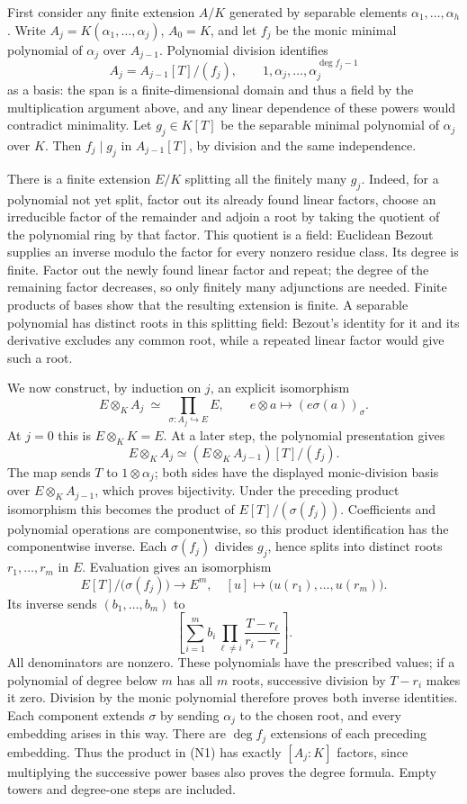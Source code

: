 \documentclass[11pt,a4paper,openany]{report}
\begin{document}
First consider any finite extension \(A/K\) generated by separable elements \(\alpha_1,\ldots,\alpha_h\). Write \(A_j=K(\alpha_1,\ldots,\alpha_j)\), \(A_0=K\), and let \(f_j\) be the monic minimal polynomial of \(\alpha_j\) over \(A_{j-1}\). Polynomial division identifies \[
A_j=A_{j-1}[T]/(f_j),\qquad
1,\alpha_j,\ldots,\alpha_j^{\deg f_j-1}
\] as a basis: the span is a finite-dimensional domain and thus a field by the multiplication argument above, and any linear dependence of these powers would contradict minimality. Let \(g_j\in K[T]\) be the separable minimal polynomial of \(\alpha_j\) over \(K\). Then \(f_j\mid g_j\) in \(A_{j-1}[T]\), by division and the same independence.

There is a finite extension \(E/K\) splitting all the finitely many \(g_j\). Indeed, for a polynomial not yet split, factor out its already found linear factors, choose an irreducible factor of the remainder and adjoin a root by taking the quotient of the polynomial ring by that factor. This quotient is a field: Euclidean Bezout supplies an inverse modulo the factor for every nonzero residue class. Its degree is finite. Factor out the newly found linear factor and repeat; the degree of the remaining factor decreases, so only finitely many adjunctions are needed. Finite products of bases show that the resulting extension is finite. A separable polynomial has distinct roots in this splitting field: Bezout's identity for it and its derivative excludes any common root, while a repeated linear factor would give such a root.

We now construct, by induction on \(j\), an explicit isomorphism \[
E\otimes_K A_j\ \simeq\ \prod_{\sigma:A_j\hookrightarrow E}E,
\qquad e\otimes a\longmapsto(e\sigma(a))_\sigma. \tag{N1}
\] At \(j=0\) this is \(E\otimes_K K=E\). At a later step, the polynomial presentation gives \[
E\otimes_K A_j\simeq
 (E\otimes_K A_{j-1})[T]/(f_j).
\] The map sends \(T\) to \(1\otimes\alpha_j\); both sides have the displayed monic-division basis over \(E\otimes_K A_{j-1}\), which proves bijectivity. Under the preceding product isomorphism this becomes the product of \(E[T]/(\sigma(f_j))\). Coefficients and polynomial operations are componentwise, so this product identification has the componentwise inverse. Each \(\sigma(f_j)\) divides \(g_j\), hence splits into distinct roots \(r_1,\ldots,r_m\) in \(E\). Evaluation gives an isomorphism \[
E[T]/\bigl(\sigma(f_j)\bigr)\longrightarrow E^m,
\quad [u]\longmapsto\bigl(u(r_1),\ldots,u(r_m)\bigr).
\] Its inverse sends \((b_1,\ldots,b_m)\) to \[
\left[\sum_{i=1}^m b_i
       \prod_{\ell\ne i}\frac{T-r_\ell}{r_i-r_\ell}\right]. \tag{N2}
\] All denominators are nonzero. These polynomials have the prescribed values; if a polynomial of degree below \(m\) has all \(m\) roots, successive division by \(T-r_i\) makes it zero. Division by the monic polynomial therefore proves both inverse identities. Each component extends \(\sigma\) by sending \(\alpha_j\) to the chosen root, and every embedding arises in this way. There are \(\deg f_j\) extensions of each preceding embedding. Thus the product in (N1) has exactly \([A_j:K]\) factors, since multiplying the successive power bases also proves the degree formula. Empty towers and degree-one steps are included.
\end{document}
